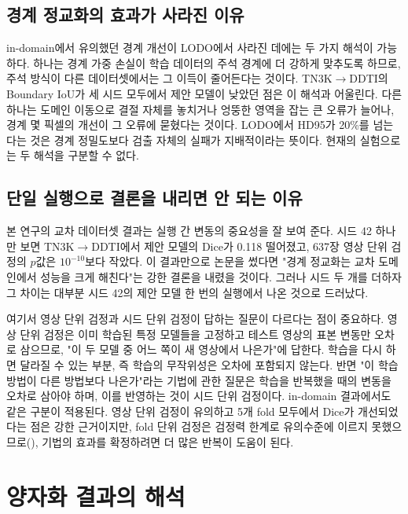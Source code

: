 \subsection{경계 정교화의 효과가 사라진 이유}

in-domain에서 유의했던 경계 개선이 LODO에서 사라진 데에는 두 가지 해석이 가능하다. 하나는 경계 가중 손실이
학습 데이터의 주석 경계에 더 강하게 맞추도록 하므로, 주석 방식이 다른 데이터셋에서는 그 이득이 줄어든다는 것이다.
TN3K$\rightarrow$DDTI의 Boundary IoU가 세 시드 모두에서 제안 모델이 낮았던 점은 이 해석과 어울린다. 다른 하나는
도메인 이동으로 결절 자체를 놓치거나 엉뚱한 영역을 잡는 큰 오류가 늘어나, 경계 몇 픽셀의 개선이 그 오류에 묻혔다는
것이다. LODO에서 HD95가 20\%를 넘는다는 것은 경계 정밀도보다 검출 자체의 실패가 지배적이라는 뜻이다.
현재의 실험으로는 두 해석을 구분할 수 없다.

\subsection{단일 실행으로 결론을 내리면 안 되는 이유}

본 연구의 교차 데이터셋 결과는 실행 간 변동의 중요성을 잘 보여 준다. 시드 42 하나만 보면 TN3K$\rightarrow$DDTI에서
제안 모델의 Dice가 0.118 떨어졌고, 637장 영상 단위 검정의 $p$값은 $10^{-10}$보다 작았다. 이 결과만으로 논문을 썼다면
"경계 정교화는 교차 도메인에서 성능을 크게 해친다"는 강한 결론을 내렸을 것이다. 그러나 시드 두 개를 더하자 그 차이는
대부분 시드 42의 제안 모델 한 번의 실행에서 나온 것으로 드러났다.

여기서 영상 단위 검정과 시드 단위 검정이 답하는 질문이 다르다는 점이 중요하다. 영상 단위 검정은 이미 학습된 특정 모델들을
고정하고 테스트 영상의 표본 변동만 오차로 삼으므로, "이 두 모델 중 어느 쪽이 새 영상에서 나은가"에 답한다. 학습을 다시 하면
달라질 수 있는 부분, 즉 학습의 무작위성은 오차에 포함되지 않는다. 반면 "이 학습 방법이 다른 방법보다 나은가"라는 기법에
관한 질문은 학습을 반복했을 때의 변동을 오차로 삼아야 하며, 이를 반영하는 것이 시드 단위 검정이다\citep{bouthillier2021variance}.
in-domain 결과에서도 같은 구분이 적용된다. 영상 단위 검정이 유의하고 5개 fold 모두에서 Dice가 개선되었다는 점은 강한 근거이지만,
fold 단위 검정은 검정력 한계로 유의수준에 이르지 못했으므로(), 기법의 효과를 확정하려면 더 많은 반복이
도움이 된다.

\section{양자화 결과의 해석}\label{sec:disc_quant}

